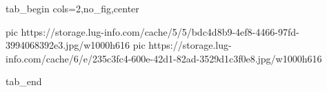  
 
 
 
 


\ifcmt
  tab_begin cols=2,no_fig,center

     pic https://storage.lug-info.com/cache/5/5/bdc4d8b9-4ef8-4466-97fd-3994068392e3.jpg/w1000h616%
		 pic https://storage.lug-info.com/cache/6/e/235c3fc4-600e-42d1-82ad-3529d1c3f0e8.jpg/w1000h616%

  tab_end
\fi
